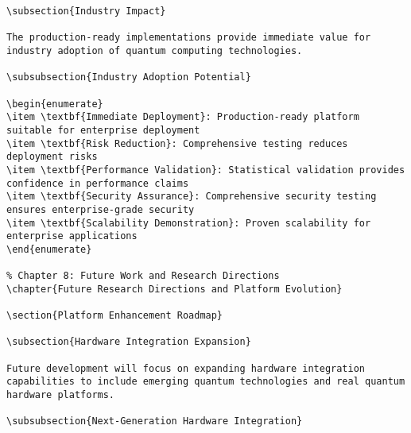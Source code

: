 \documentclass[12pt,a4paper]{report}
\begin{document}
\begin{lstlisting}
\subsection{Industry Impact}

The production-ready implementations provide immediate value for industry adoption of quantum computing technologies.

\subsubsection{Industry Adoption Potential}

\begin{enumerate}
\item \textbf{Immediate Deployment}: Production-ready platform suitable for enterprise deployment
\item \textbf{Risk Reduction}: Comprehensive testing reduces deployment risks
\item \textbf{Performance Validation}: Statistical validation provides confidence in performance claims
\item \textbf{Security Assurance}: Comprehensive security testing ensures enterprise-grade security
\item \textbf{Scalability Demonstration}: Proven scalability for enterprise applications
\end{enumerate}

% Chapter 8: Future Work and Research Directions
\chapter{Future Research Directions and Platform Evolution}

\section{Platform Enhancement Roadmap}

\subsection{Hardware Integration Expansion}

Future development will focus on expanding hardware integration capabilities to include emerging quantum technologies and real quantum hardware platforms.

\subsubsection{Next-Generation Hardware Integration}


\end{lstlisting}
\end{document}
